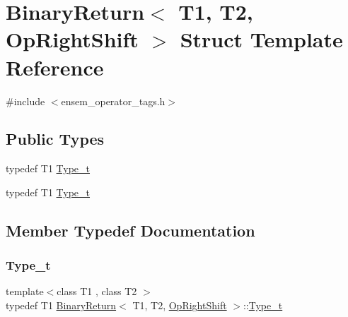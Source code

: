 \hypertarget{structBinaryReturn_3_01T1_00_01T2_00_01OpRightShift_01_4}{}\section{Binary\+Return$<$ T1, T2, Op\+Right\+Shift $>$ Struct Template Reference}
\label{structBinaryReturn_3_01T1_00_01T2_00_01OpRightShift_01_4}


{\ttfamily \#include $<$ensem\+\_\+operator\+\_\+tags.\+h$>$}

\subsection*{Public Types}
\begin{DoxyCompactItemize}
\item 
typedef T1 \mbox{\hyperlink{structBinaryReturn_3_01T1_00_01T2_00_01OpRightShift_01_4_a669ff609f8117f57e60c22cb953ff2d6}{Type\+\_\+t}}
\item 
typedef T1 \mbox{\hyperlink{structBinaryReturn_3_01T1_00_01T2_00_01OpRightShift_01_4_a669ff609f8117f57e60c22cb953ff2d6}{Type\+\_\+t}}
\end{DoxyCompactItemize}


\subsection{Member Typedef Documentation}
\mbox{\label{structBinaryReturn_3_01T1_00_01T2_00_01OpRightShift_01_4_a669ff609f8117f57e60c22cb953ff2d6}} 
\subsubsection{\texorpdfstring{Type\_t}{Type\_t}\hspace{0.1cm}{\footnotesize\ttfamily [1/2]}}
{\footnotesize\ttfamily template$<$class T1 , class T2 $>$ \\
typedef T1 \mbox{\hyperlink{structBinaryReturn}{Binary\+Return}}$<$ T1, T2, \mbox{\hyperlink{structOpRightShift}{Op\+Right\+Shift}} $>$\+::\mbox{\hyperlink{structBinaryReturn_3_01T1_00_01T2_00_01OpRightShift_01_4_a669ff609f8117f57e60c22cb953ff2d6}{Type\+\_\+t}}}

